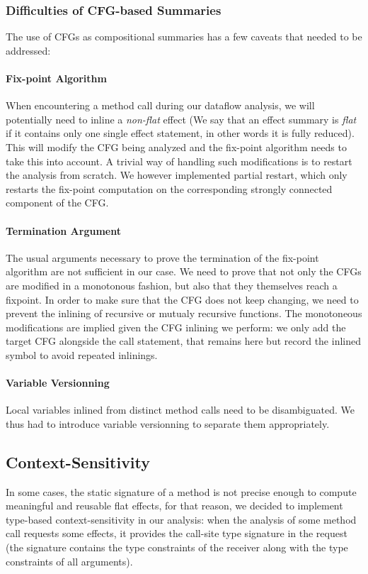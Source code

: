\documentclass[a4paper]{article}
\begin{document}
\subsubsection{Difficulties of CFG-based Summaries}

The use of CFGs as compositional summaries has a few caveats that needed to be
addressed:

\paragraph{Fix-point Algorithm} When encountering a method call during our
dataflow analysis, we will potentially need to inline a \emph{non-flat} effect
(We say that an effect summary is \emph{flat} if it contains only one single
effect statement, in other words it is fully reduced). This will modify the CFG
being analyzed and the fix-point algorithm needs to take this into account. A
trivial way of handling such modifications is to restart the analysis from
scratch. We however implemented partial restart, which only restarts the
fix-point computation on the corresponding strongly connected component of the
CFG.

\paragraph{Termination Argument} The usual arguments necessary to prove the
termination of the fix-point algorithm are not sufficient in our case. We need
to prove that not only the CFGs are modified in a monotonous fashion, but also
that they themselves reach a fixpoint. In order to make sure that the CFG does
not keep changing, we need to prevent the inlining of recursive or mutualy
recursive functions. The monotoneous modifications are implied given the
CFG inlining we perform: we only add the target CFG alongside the call
statement, that remains here but record the inlined symbol to avoid repeated
inlinings.

\paragraph{Variable Versionning} Local variables inlined from distinct method
calls need to be disambiguated. We thus had to introduce variable versionning
to separate them appropriately.


\subsection{Context-Sensitivity}
In some cases, the static signature of a method is not precise enough to
compute meaningful and reusable flat effects, for that reason, we decided to
implement type-based context-sensitivity in our analysis: when the analysis of
some method call requests some effects, it provides the call-site type
signature in the request (the signature contains the type constraints of the
receiver along with the type constraints of all arguments).
\end{document}
